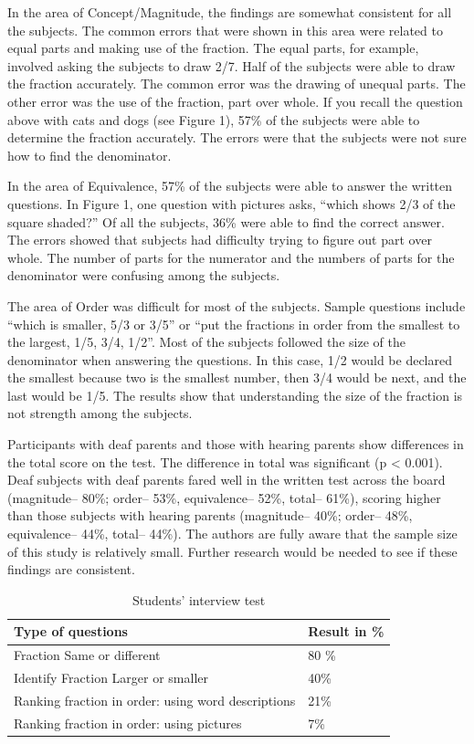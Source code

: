 \documentclass[11.5pt]{sig-alternate} %
\begin{document}
\begin{large}
In the area of Concept/Magnitude, the findings are somewhat consistent for all the subjects. The common errors that were shown in this area were related to equal parts and making use of the fraction. The equal parts, for example, involved asking the subjects to draw 2/7.  Half of the subjects were able to draw the fraction accurately. The common error was the drawing of unequal parts. The other error was the use of the fraction, part over whole. If you recall the question above with cats and dogs (see Figure 1), 57\% of the subjects were able to determine the fraction accurately. The errors were that the subjects were not sure how to find the denominator.

In the area of Equivalence, 57\% of the subjects were able to answer the written questions. In Figure 1, one question with pictures asks, “which shows 2/3 of the square shaded?”  Of all the subjects, 36\% were able to find the correct answer. The errors showed that subjects had difficulty trying to figure out part over whole. The number of parts for the numerator and the numbers of parts for the denominator were confusing among the subjects.

The area of Order was difficult for most of the subjects. Sample questions include “which is smaller, 5/3 or 3/5” or “put the fractions in order from the smallest to the largest, 1/5, 3/4, 1/2”. Most of the subjects followed the size of the denominator when answering the questions. In this case, 1/2 would be declared the smallest because two is the smallest number, then 3/4 would be next, and the last would be 1/5. The results show that understanding the size of the fraction is not strength among the subjects.

Participants with deaf parents and those with hearing parents show differences in the total score on the test. The difference in total was significant (p < 0.001). Deaf subjects with deaf parents fared well in the written test across the board (magnitude– 80\%; order– 53\%, equivalence– 52\%, total– 61\%), scoring higher than those subjects with hearing parents (magnitude– 40\%; order– 48\%, equivalence– 44\%, total– 44\%). The authors are fully aware that the sample size of this study is relatively small. Further research would be needed to see if these findings are consistent.

\begin{table}[ht]
\caption{Students’ interview test}
\begin{tabular}{|l|l|}
\hline
Type of questions & Result in \% \\ \hline
Fraction Same or different & 80 \% \\ \hline
Identify Fraction Larger or smaller & 40\% \\ \hline
Ranking fraction in order: using word descriptions & 21\% \\ \hline
Ranking fraction in order: using pictures & 7\% \\ \hline
\end{tabular}
\end{table}


\end{large}
\end{document}
